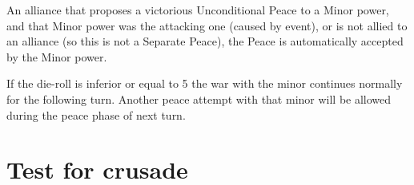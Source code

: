 An alliance that proposes a victorious Unconditional Peace to a Minor power,
and that Minor power was the attacking one (caused by event), or is not allied
to an alliance (so this is not a Separate Peace), the Peace is automatically
accepted by the Minor power.

If the die-roll is inferior or equal to 5 the war with the minor continues
normally for the following turn. Another peace attempt with that minor will be
allowed during the peace phase of next turn.

\section{Test for crusade}\label{chPeace:Crusade}

